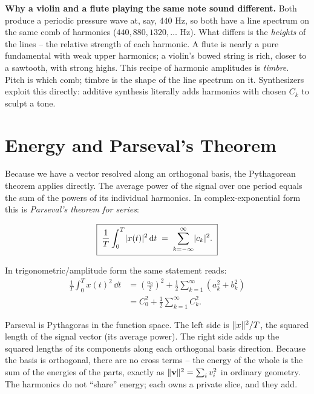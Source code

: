 \begin{applicationbox}
\textbf{Why a violin and a flute playing the same note sound different.} Both produce a
periodic pressure wave at, say, $440$ Hz, so both have a line spectrum on the same comb of
harmonics ($440, 880, 1320, \dots$ Hz). What differs is the \emph{heights} of the lines --
the relative strength of each harmonic. A flute is nearly a pure fundamental with weak
upper harmonics; a violin's bowed string is rich, closer to a sawtooth, with strong highs.
This recipe of harmonic amplitudes is \emph{timbre}. Pitch is which comb; timbre is the
shape of the line spectrum on it. Synthesizers exploit this directly: additive synthesis
literally adds harmonics with chosen $C_k$ to sculpt a tone.
\end{applicationbox}

\section{Energy and Parseval's Theorem}

Because we have a vector resolved along an orthogonal basis, the Pythagorean theorem
applies directly. The average power of the signal over one period equals the sum of the
powers of its individual harmonics. In complex-exponential form this is \emph{Parseval's
theorem for series}:

\begin{equation}
\boxed{\;\frac{1}{T}\int_{0}^{T}\lvert x(t)\rvert^2\,\mathrm{d} t \;=\; \sum_{k=-\infty}^{\infty}\lvert c_k\rvert^2.\;}
\label{ch06:parseval}
\end{equation}

In trigonometric/amplitude form the same statement reads:
\begin{align*}
\frac{1}{T}\int_0^T x(t)^2\,\dd t &= \left(\frac{a_0}{2}\right)^2 + \frac{1}{2}\sum_{k=1}^{\infty}(a_k^2+b_k^2) \\
&= C_0^2 + \frac{1}{2}\sum_{k=1}^{\infty}C_k^2.
\end{align*}

\begin{whybox}
Parseval is Pythagoras in the function space. The left side is \(\lVert x\rVert^2/T\), the
squared length of the signal vector (its average power). The right side adds up the squared
lengths of its components along each orthogonal basis direction. Because the basis is
orthogonal, there are no cross terms -- the energy of the whole is the sum of the energies
of the parts, exactly as \(\lVert\mathbf{v}\rVert^2 = \sum_i v_i^2\) in ordinary geometry. The
harmonics do not ``share'' energy; each owns a private slice, and they add.
\end{whybox}

